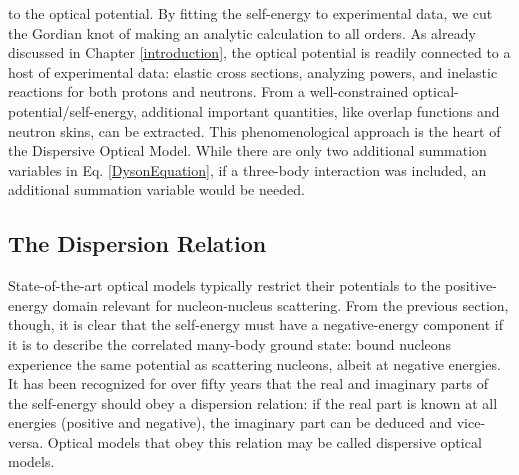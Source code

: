 to the optical potential. By fitting the self-energy to experimental data, we
cut the Gordian knot of making an analytic calculation to all orders.
As already discussed in Chapter \ref{introduction}, the optical potential is  
readily connected to a host of experimental data: elastic cross sections, analyzing powers, and 
inelastic reactions for both protons and neutrons.
From a well-constrained optical-potential/self-energy, additional important quantities, like
overlap functions and neutron skins, can be extracted. This phenomenological approach is the 
heart of the Dispersive Optical Model.
\footnotetext
{
    While there are only two additional summation variables in Eq.
    \ref{DysonEquation}, if a three-body interaction was included,
    an additional summation variable would be needed.
}

\subsection{The Dispersion Relation}
State-of-the-art optical models \cite{CH89, KoningDelaroche} typically
restrict their potentials to the
positive-energy domain relevant for nucleon-nucleus scattering. From the previous
section, though, it is clear that the self-energy must have a negative-energy component
if it is to describe the
correlated many-body ground state: bound nucleons experience the same potential
as scattering nucleons, albeit at negative energies.
It has been recognized for over fifty years \cite{Feshbach1958a,
Passatore1967} that the real and imaginary
parts of the self-energy should obey a dispersion relation:
if the real part is known at all energies (positive and
negative), the imaginary part can be deduced and vice-versa. Optical models that obey this relation
may be called dispersive optical models.

